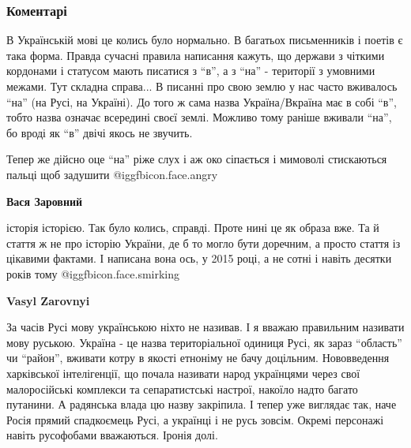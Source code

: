  
 
 
 
 
\subsubsection{Коментарі}

\begin{itemize} %

В Українській мові це колись було нормально. В багатьох письменників і поетів є
така форма. Правда сучасні правила написання кажуть, що держави з чіткими
кордонами і статусом мають писатися з \enquote{в}, а з \enquote{на} - території з умовними
межами. Тут складна справа... В писанні про свою землю у нас часто вживалось
\enquote{на} (на Русі, на Україні). До того ж сама назва Україна/Вкраїна має в собі
\enquote{в}, тобто назва означає всередині своєї землі. Можливо тому раніше вживали
\enquote{на}, бо вроді як \enquote{в} двічі якось не звучить.

Тепер же дійсно оце \enquote{на} ріже слух і аж око сіпається і мимоволі стискаються
пальці щоб задушити @igg{fbicon.face.angry} 

\begin{itemize} %
\textbf{Вася Заровний} 

історія історією. Так було колись, справді. Проте нині це як образа вже. Та й
стаття ж не про історію України, де б то могло бути доречним, а просто стаття
із цікавими фактами. І написана вона ось, у 2015 році, а не сотні і навіть
десятки років тому @igg{fbicon.face.smirking} 


\textbf{Vasyl Zarovnyi} 

За часів Русі мову українською ніхто не називав. І я вважаю правильним називати
мову руською. Україна - це назва територіальної одиниця Русі, як зараз
\enquote{область} чи \enquote{район}, вживати котру в якості етноніму не бачу доцільним.
Нововведення харківської інтелігенції, що почала називати народ українцями
через свої малоросійські комплекси та сепаратистські настрої, накоїло надто
багато путанини. А радянська влада цю назву закріпила. І тепер уже виглядає
так, наче Росія прямий спадкоємець Русі, а українці і не русь зовсім. Окремі
персонажі навіть русофобами вважаються. Іронія долі.


\end{itemize}
\end{itemize}
